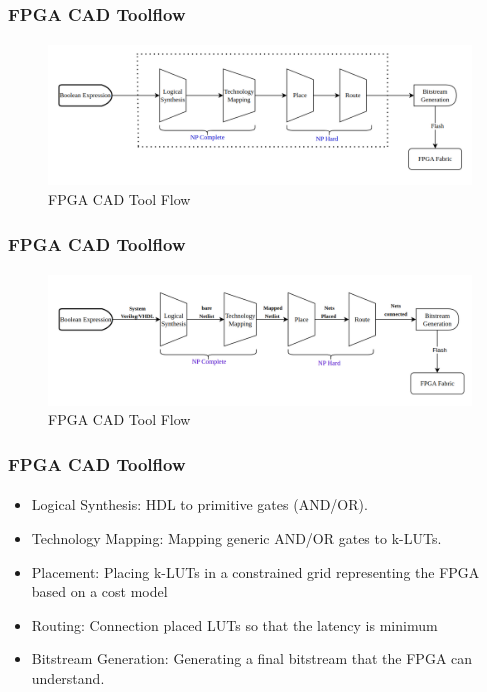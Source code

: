 \documentclass{beamer}
\begin{document}
{\begin{frame}[fragile]
  \frametitle{FPGA CAD Toolflow}
  \framesubtitle{}
   \begin{figure}
        \centering
        \includegraphics[width=1\linewidth]{images/cad_flow.png}
        \caption{FPGA CAD Tool Flow}
        \label{exa_cadflow}
    \end{figure}
\end{frame}


\begin{frame}[fragile]
  \frametitle{FPGA CAD Toolflow}
  \framesubtitle{}
   \begin{figure}
        \centering
        \includegraphics[width=1\linewidth]{images/cad_flow_des.png}
        \caption{FPGA CAD Tool Flow}
        \label{exa_cadflow}
    \end{figure}
\end{frame}

\begin{frame}[fragile]
  \frametitle{FPGA CAD Toolflow}
  \framesubtitle{}
   \begin{itemize}
     \item Logical Synthesis: HDL to primitive gates (AND/OR).
     \item Technology Mapping: Mapping generic AND/OR gates to k-LUTs.
     \item Placement: Placing k-LUTs in a constrained grid representing the FPGA
       based on a cost model
     \item Routing: Connection placed LUTs so that the latency is minimum
     \item Bitstream Generation: Generating a final bitstream that the FPGA
       can understand.
    \end{itemize}
\end{frame}


}
\end{document}
